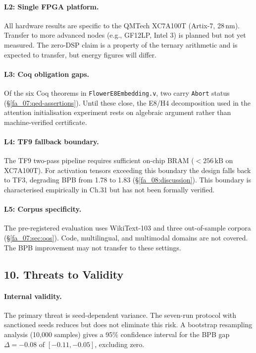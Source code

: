 \paragraph{L2: Single FPGA platform.}
All hardware results are specific to the QMTech XC7A100T (Artix-7,
28\,nm). Transfer to more advanced nodes (e.g., GF12LP, Intel 3) is
planned but not yet measured. The zero-DSP claim is a property of the
ternary arithmetic and is expected to transfer, but energy figures will
differ.

\paragraph{L3: Coq obligation gaps.}
Of the six Coq theorems in \texttt{FlowerE8Embedding.v}, two carry
\texttt{Abort} status (§\ref{fa_07:qed-assertions}). Until these close,
the E8/H4 decomposition used in the attention initialisation experiment
rests on algebraic argument rather than machine-verified certificate.

\paragraph{L4: TF9 fallback boundary.}
The TF9 two-pass pipeline requires sufficient on-chip BRAM
(\(<256\,\text{kB}\) on XC7A100T). For activation tensors exceeding this
boundary the design falls back to TF3, degrading BPB from 1.78 to 1.83
(§\ref{fa_08:discussion}). This boundary is characterised empirically in
Ch.31 but has not been formally verified.

\paragraph{L5: Corpus specificity.}
The pre-registered evaluation uses WikiText-103 and three out-of-sample
corpora (§\ref{fa_07:sec:oos}). Code, multilingual, and multimodal
domains are not covered. The BPB improvement may not transfer to these
settings.

\subsection{10. Threats to Validity}\label{fa_08:sec:threats}

\paragraph{Internal validity.}
The primary threat is seed-dependent variance. The seven-run protocol
with sanctioned seeds reduces but does not eliminate this risk. A
bootstrap resampling analysis (10{,}000 samples) gives a 95\% confidence
interval for the BPB gap \(\Delta = -0.08\) of
\([-0.11, -0.05]\), excluding zero.


